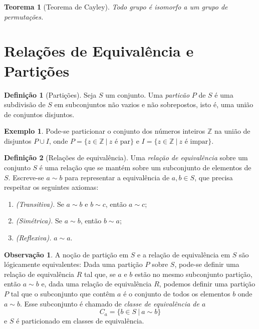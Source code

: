 \documentclass[a4paper,12pt]{report}
\theoremstyle{plain}
\newtheorem{teorema}{Teorema}[section]
\theoremstyle{definition}
\newtheorem{definicao}{Definição}[section]
\newtheorem{observacao}{Observação}[section]
\newtheorem{exemplo}{Exemplo}[section]
\begin{document}
\begin{teorema}[Teorema de Cayley]
	Todo grupo é isomorfo a um grupo de permutações.
\end{teorema}

\section{Relações de Equivalência e Partições}

\begin{definicao}[Partições]
	Seja \(S\) um conjunto. Uma \emph{particão} \(P\) de
	\(S\) é uma subdivisão de \(S\) em subconjuntos não vazios e não
	sobrepostos, isto é, uma união de conjuntos disjuntos.	
\end{definicao}

\begin{exemplo}
	Pode-se particionar o conjunto dos números inteiros
	\(\mathbb{Z}\) na união de disjuntos \(P\cup I\), onde
	\(P = \{z \in \mathbb{Z} \ |\ z \text{ é par}\}\) e
	\(I = \{z \in \mathbb{Z} \ |\ z \text{ é impar}\}\).
\end{exemplo}

\begin{definicao}[Relações de equivalência]
	Uma \emph{relação de equivalência} sobre um conjunto
	\(S\) é uma relação que se mantém sobre um subconjunto de elementos de
	\(S\). Escreve-se \(a\sim b\) para representar a equivalência de
	\(a, b \in S\), que precisa respeitar os seguintes axiomas:
	\begin{enumerate}
		\item \emph{(Transitiva).} Se \(a\sim b\) e \(b\sim c\), então \(a\sim c\);
		\item \emph{(Simétrica).} Se \(a\sim b\), então \(b\sim a\);
		\item \emph{(Reflexiva).} \(a\sim a\).
	\end{enumerate}
\end{definicao}

\begin{observacao}
	A noção de partição em \(S\) e a relação de equivalência em \(S\) são
	lógicamente equivalentes: Dada uma partição \(P\) sobre \(S\), pode-se
	definir uma relação de equivalência \(R\) tal que, se \(a\) e \(b\)
	estão no mesmo subconjunto partição, então \(a\sim b\) e, dada uma
	relação de equivalência \(R\), podemos definir uma partição \(P\) tal
	que o subconjunto que contêm \(a\) é o conjunto de todos os elementos
	\(b\) onde \(a\sim b\). Esse subconjunto é chamado de \emph{classe de
		equivalência de \(a\)}
	\[C_a = \{b\in S \ | \ a\sim b\}\]
	e \(S\) é particionado em classes de equivalência.
\end{observacao}
\end{document}
